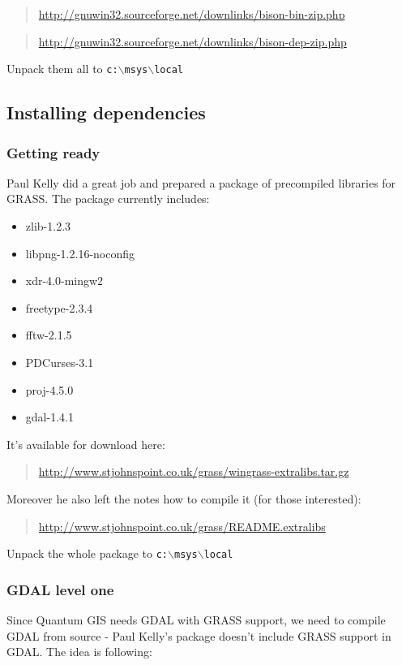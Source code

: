 	\begin{quotation}
\url{http://gnuwin32.sourceforge.net/downlinks/bison-bin-zip.php}
	\end{quotation}

	\begin{quotation}
\url{http://gnuwin32.sourceforge.net/downlinks/bison-dep-zip.php}
	\end{quotation}

Unpack them all to \texttt{c:$\backslash$msys$\backslash$local}

\subsection{Installing dependencies}
\subsubsection{Getting ready}
Paul Kelly did a great job and prepared a package of precompiled libraries for GRASS.
The package currently includes:

\begin{itemize}
\item zlib-1.2.3
\item libpng-1.2.16-noconfig
\item xdr-4.0-mingw2
\item freetype-2.3.4
\item fftw-2.1.5
\item PDCurses-3.1
\item proj-4.5.0
\item gdal-1.4.1
\end{itemize}

It's available for download here:

	\begin{quotation}
\url{http://www.stjohnspoint.co.uk/grass/wingrass-extralibs.tar.gz}
	\end{quotation}

Moreover he also left the notes how to compile it (for those interested):

	\begin{quotation}
\url{http://www.stjohnspoint.co.uk/grass/README.extralibs}
	\end{quotation}

Unpack the whole package to \texttt{c:$\backslash$msys$\backslash$local}

\subsubsection{GDAL level one}
Since Quantum GIS needs GDAL with GRASS support, we need to compile GDAL
from source - Paul Kelly's package doesn't include GRASS support in GDAL.
The idea is following:

